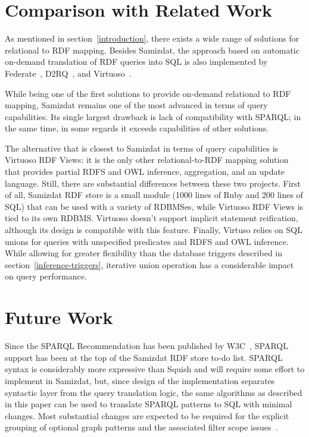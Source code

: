 \documentclass[conference,letterpaper]{IEEEtran}
\begin{document}
\section{Comparison with Related Work}
\label{related-work}

As mentioned in section~\ref{introduction}, there exists a wide range of
solutions for relational to RDF mapping. Besides Samizdat, the approach
based on automatic on-demand translation of RDF queries into SQL is also
implemented by Federate~\cite{federate}, D2RQ~\cite{d2rq}, and
Virtuoso~\cite{virtuoso}.

While being one of the first solutions to provide on-demand relational
to RDF mapping, Samizdat remains one of the most advanced in terms of
query capabilities. Its single largest drawback is lack of compatibility
with SPARQL; in the same time, in some regards it exceeds capabilities
of other solutions.

The alternative that is closest to Samizdat in terms of query
capabilities is Virtuoso RDF Views: it is the only other
relational-to-RDF mapping solution that provides partial RDFS and OWL
inference, aggregation, and an update language. Still, there are
substantial differences between these two projects. First of all,
Samizdat RDF store is a small module (1000 lines of Ruby and 200 lines
of SQL) that can be used with a variety of RDBMSes, while Virtuoso RDF
Views is tied to its own RDBMS. Virtuoso doesn't support implicit
statement reification, although its design is compatible with this
feature. Finally, Virtuso relies on SQL unions for queries with
unspecified predicates and RDFS and OWL inference. While allowing for
greater flexibility than the database triggers described in
section~\ref{inference-triggers}, iterative union operation has a
considerable impact on query performance.


\section{Future Work}
\label{future-work}

Since the SPARQL Recommendation has been published by W3C~\cite{sparql},
SPARQL support has been at the top of the Samizdat RDF store to-do list.
SPARQL syntax is considerably more expressive than Squish and will
require some effort to implement in Samizdat, but, since design of the
implementation separates syntactic layer from the query translation
logic, the same algorithms as described in this paper can be used to
translate SPARQL patterns to SQL with minimal changes. Most substantial
changes are expected to be required for the explicit grouping of
optional graph patterns and the associated filter scope
issues~\cite{cyganiak}.
\end{document}
